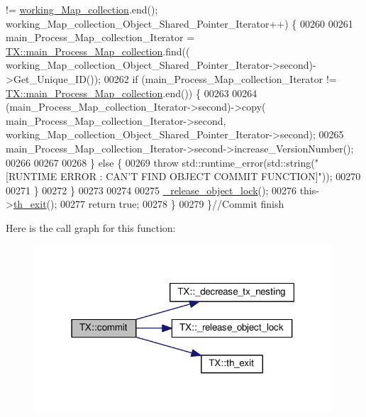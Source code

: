 \begin{DoxyCode}
       != \hyperlink{class_t_x_a81aafda16e2f20e36ec6c68e584668ff_a81aafda16e2f20e36ec6c68e584668ff}{working\_Map\_collection}.end(); 
      working\_Map\_collection\_Object\_Shared\_Pointer\_Iterator++) \{
00260             
00261                 main\_Process\_Map\_collection\_Iterator = 
      \hyperlink{class_t_x_a1a45d726894190695314464d7cd97c29_a1a45d726894190695314464d7cd97c29}{TX::main\_Process\_Map\_collection}.find((
      working\_Map\_collection\_Object\_Shared\_Pointer\_Iterator->second)->Get\_Unique\_ID());
00262                 \textcolor{keywordflow}{if} (main\_Process\_Map\_collection\_Iterator != 
      \hyperlink{class_t_x_a1a45d726894190695314464d7cd97c29_a1a45d726894190695314464d7cd97c29}{TX::main\_Process\_Map\_collection}.end()) \{
00263 
00264                     (main\_Process\_Map\_collection\_Iterator->second)->copy(
      main\_Process\_Map\_collection\_Iterator->second, working\_Map\_collection\_Object\_Shared\_Pointer\_Iterator->second);
00265                     main\_Process\_Map\_collection\_Iterator->second->increase\_VersionNumber();
00266 
00267 
00268                 \} \textcolor{keywordflow}{else} \{
00269                     \textcolor{keywordflow}{throw} std::runtime\_error(std::string(\textcolor{stringliteral}{"[RUNTIME ERROR : CAN'T FIND OBJECT COMMIT
       FUNCTION]"}));
00270 
00271                 \}
00272         \}
00273 
00274 
00275         \hyperlink{class_t_x_a4c13d2015dc15d0f788fa9a1413f0463_a4c13d2015dc15d0f788fa9a1413f0463}{\_release\_object\_lock}();
00276         this->\hyperlink{class_t_x_ae045534c4a9d39bd5c6ea2a39a372a79_ae045534c4a9d39bd5c6ea2a39a372a79}{th\_exit}();
00277         \textcolor{keywordflow}{return} \textcolor{keyword}{true};
00278     \}
00279 \}\textcolor{comment}{//Commit finish}
\end{DoxyCode}


Here is the call graph for this function\+:
\nopagebreak
\begin{figure}[H]
\begin{center}
\leavevmode
\includegraphics[width=315pt]{class_t_x_a9dde5d356b35e557448e58d260087356_a9dde5d356b35e557448e58d260087356_cgraph}
\end{center}
\end{figure}


